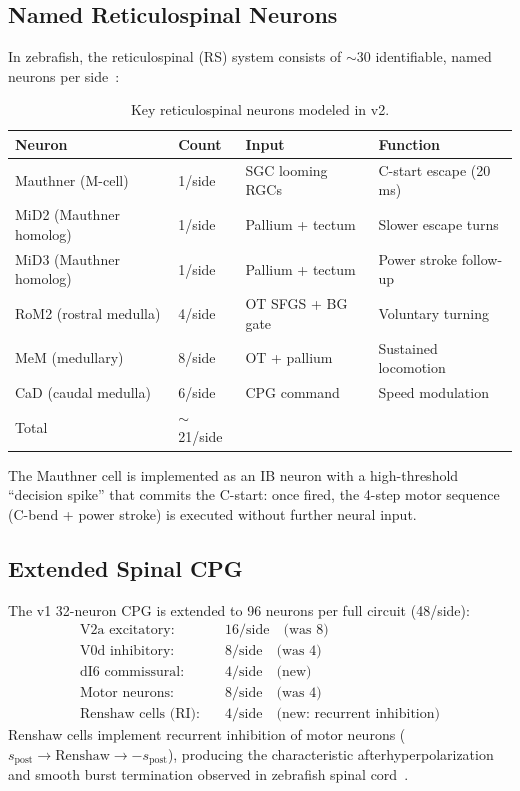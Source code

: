 \documentclass[11pt,a4paper]{article}
\begin{document}
\subsection{Named Reticulospinal Neurons}

In zebrafish, the reticulospinal (RS) system consists of $\sim$30 identifiable,
named neurons per side~\cite{orger2008}:

\begin{table}[H]
\centering
\caption{Key reticulospinal neurons modeled in v2.}
\label{tab:rs_neurons}
\begin{tabular}{llll}
\toprule
Neuron & Count & Input & Function \\
\midrule
Mauthner (M-cell)      & 1/side & SGC looming RGCs  & C-start escape (20\,ms) \\
MiD2 (Mauthner homolog) & 1/side & Pallium + tectum  & Slower escape turns \\
MiD3 (Mauthner homolog) & 1/side & Pallium + tectum  & Power stroke follow-up \\
RoM2 (rostral medulla)  & 4/side & OT SFGS + BG gate & Voluntary turning \\
MeM (medullary)         & 8/side & OT + pallium      & Sustained locomotion \\
CaD (caudal medulla)    & 6/side & CPG command       & Speed modulation \\
\midrule
Total & $\sim$21/side & & \\
\bottomrule
\end{tabular}
\end{table}

The Mauthner cell is implemented as an IB neuron with a high-threshold
``decision spike'' that commits the C-start: once fired, the 4-step motor
sequence (C-bend + power stroke) is executed without further neural input.

\subsection{Extended Spinal CPG}

The v1 32-neuron CPG is extended to 96 neurons per full circuit (48/side):
\begin{equation}
\begin{aligned}
  \text{V2a excitatory}: &\quad 16/\text{side} \quad\text{(was 8)} \\
  \text{V0d inhibitory}: &\quad  8/\text{side} \quad\text{(was 4)} \\
  \text{dI6 commissural}: &\quad  4/\text{side} \quad\text{(new)} \\
  \text{Motor neurons}:   &\quad  8/\text{side} \quad\text{(was 4)} \\
  \text{Renshaw cells (RI)}: &\quad 4/\text{side} \quad\text{(new: recurrent inhibition)}
\end{aligned}
\end{equation}
Renshaw cells implement recurrent inhibition of motor neurons
($s_\text{post} \to \text{Renshaw} \to -s_\text{post}$),
producing the characteristic afterhyperpolarization and smooth burst termination
observed in zebrafish spinal cord~\cite{bhatt2009}.
\end{document}

